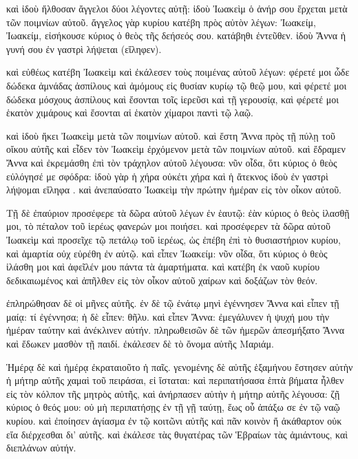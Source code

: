 \documentclass[12pt]{book} %
\begin{document}
\begin{pairs}
\begin{Leftside}
\pend\pstart
καὶ ἰδοὺ ἤλθοσαν ἄγγελοι δύοι λέγοντες αὐτῇ: ἰδοὺ Ἰωακεὶμ ὁ ἀνήρ σου ἔρχεται μετὰ τῶν ποιμνίων αὐτοῦ. ἄγγελος γὰρ κυρίου κατέβη πρὸς αὐτὸν λέγων: Ἰωακείμ, Ἰωακείμ, εἰσήκουσε κύριος ὁ θεὸς τῆς δεήσεός σου. κατάβηθι ἐντεῦθεν. ἰδοὺ Ἄννα ἡ γυνή σου ἐν γαστρὶ λήψεται (εἴληφεν).

\pend\pstart
καὶ εὐθέως κατέβη Ἰωακεὶμ καὶ ἐκάλεσεν τοὺς ποιμένας αὐτοῦ λέγων: φέρετέ μοι ὧδε δώδεκα ἀμνάδας ἀσπίλους καὶ ἀμόμους εἰς θυσίαν κυρίῳ τῷ θεῷ μου, καὶ φέρετέ μοι δώδεκα μόσχους ἀσπίλους καὶ ἔσονται τοῖς ἱερεῦσι καὶ τῇ γερουσίᾳ, καὶ φέρετέ μοι ἑκατὸν χιμάρους καὶ ἔσονται αἱ ἑκατὸν χίμαροι παντὶ τῷ λαῷ.

\pend\pstart
καὶ ἰδοὺ ἥκει Ἰωακεὶμ μετὰ τῶν ποιμνίων αὐτοῦ. καὶ ἔστη Ἄννα πρὸς τῇ πύλῃ τοῦ οἴκου αὐτῆς καὶ εἶδεν τὸν Ἰωακεὶμ ἐρχόμενον μετὰ τῶν ποιμνίων αὐτοῦ. καὶ ἔδραμεν Ἄννα καὶ ἐκρεμάσθη ἐπὶ τὸν τράχηλον αὐτοῦ λέγουσα: νῦν οἶδα, ὅτι κύριος ὁ θεὸς εὐλόγησέ με σφόδρα: ἰδοὺ γὰρ ἡ χήρα οὐκέτι χήρα καὶ ἡ ἄτεκνος ἰδοὺ ἐν γαστρὶ λήψομαι εἴληφα . καὶ ἀνεπαύσατο Ἰωακεὶμ τὴν πρώτην ἡμέραν εἰς τὸν οἶκον αὐτοῦ.

\pend\pstart
{}

\pend\pstart
Τῇ δὲ ἐπαύριον προσέφερε τὰ δῶρα αὐτοῦ λέγων ἐν ἑαυτῷ: ἐὰν κύριος ὁ θεὸς ἱλασθῇ μοι, τὸ πέταλον τοῦ ἱερέως φανερών μοι ποιήσει. καὶ προσέφερεν τὰ δῶρα αὐτοῦ Ἰωακεὶμ καὶ προσεῖχε τῷ πετάλῳ τοῦ ἱερέως, ὡς ἐπέβη ἐπὶ τὸ θυσιαστήριον κυρίου, καὶ ἁμαρτία οὐχ εὑρέθη ἐν αὐτῷ. καὶ εἶπεν Ἰωακείμ: νῦν οἶδα, ὅτι κύριος ὁ θεὸς ἱλάσθη μοι καὶ ἀφεῖλέν μου πάντα τὰ ἁμαρτήματα. καὶ κατέβη ἐκ ναοῦ κυρίου δεδικαιωμένος καὶ ἀπῆλθεν εἰς τὸν οἶκον αὐτοῦ χαίρων καὶ δοξάζων τὸν θεόν.

\pend\pstart
ἐπληρώθησαν δὲ οἱ μῆνες αὐτῆς. ἐν δὲ τῷ ἐνάτῳ μηνὶ ἐγέννησεν Ἄννα καὶ εἶπεν τῇ μαίᾳ: τί ἐγέννησα; ἡ δὲ εἶπεν: θῆλυ. καὶ εἶπεν Ἄννα: ἐμεγάλυνεν ἡ ψυχή μου τὴν ἡμέραν ταύτην καὶ ἀνέκλινεν αὐτήν. πληρωθεισῶν δὲ τῶν ἡμερῶν ἀπεσμήξατο Ἄννα καὶ ἔδωκεν μασθὸν τῇ παιδί. ἐκάλεσεν δὲ τὸ ὄνομα αὐτῆς Μαριάμ.

\pend\pstart

\pend\pstart
Ἡμέρᾳ δὲ καὶ ἡμέρᾳ ἐκραταιοῦτο ἡ παῖς. γενομένης δὲ αὐτῆς ἑξαμήνου ἔστησεν αὐτὴν ἡ μήτηρ αὐτῆς χαμαὶ τοῦ πειράσαι, εἰ ἵσταται: καὶ περιπατήσασα ἑπτὰ βήματα ἦλθεν εἰς τὸν κόλπον τῆς μητρὸς αὐτῆς, καὶ ἀνήρπασεν αὐτὴν ἡ μήτηρ αὐτῆς λέγουσα: ζῇ κύριος ὁ θεός μου: οὐ μὴ περιπατήσῃς ἐν τῇ γῇ ταύτῃ, ἕως οὗ ἀπάξω σε ἐν τῷ ναῷ κυρίου. καὶ ἐποίησεν ἁγίασμα ἐν τῷ κοιτῶνι αὐτῆς καὶ πᾶν κοινὸν ἤ ἀκάθαρτον οὐκ εἴα διέρχεσθαι δι' αὐτῆς. καὶ ἐκάλεσε τὰς θυγατέρας τῶν Ἑβραίων τὰς ἀμιάντους, καὶ διεπλάνων αὐτήν.


\end{Leftside}
\end{pairs}
\end{document}
